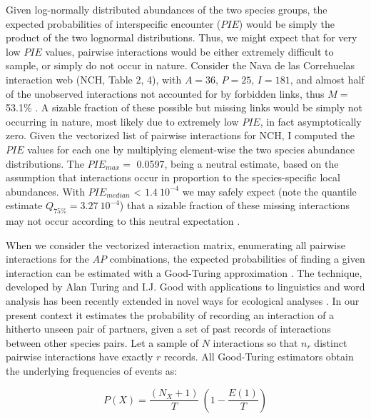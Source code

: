 \documentclass[12pt]{article}
\begin{document}
Given log-normally distributed abundances of the two species groups, the expected probabilities of interspecific encounter ($PIE$) would be simply the product of the two lognormal distributions. Thus, we might expect that for very low $PIE$ values, pairwise interactions would be either extremely difficult to sample, or simply do not occur in nature. Consider the Nava de las Correhuelas interaction web (NCH, Table 2, 4), with $A= 36$, $P= 25$, $I= 181$, and almost half of the unobserved interactions not accounted for by forbidden links, thus $M=$ 53.1\% \citep{Jordano:2009c}. A sizable fraction of these possible but missing links would be simply not occurring in nature, most likely due to extremely low $PIE$, in fact asymptotically zero. Given the vectorized list of pairwise interactions for NCH, I computed the $PIE$ values for each one by multiplying element-wise the two species abundance distributions. The ${PIE}_{max}=$ 0.0597, being a neutral estimate, based on the assumption that interactions occur in proportion to the species-specific local abundances. With $PIE_{median}$ < $1.4\ 10^{-4}$ we may safely expect (note the quantile estimate $Q_{75\%}= $$3.27\ 10^{-4}$) that a sizable fraction of these missing interactions may  not occur according to this neutral expectation \citep{E31/2562,Olesen:2011a} \citep[neutral forbidden links, \emph{sensu}][]{Canard:2012jy}.  

When we consider the vectorized interaction matrix, enumerating all pairwise interactions for the $AP$ combinations, the expected probabilities of finding a given interaction can be estimated with a Good-Turing approximation \citep{Good:1953tn}. The technique, developed by Alan Turing and I.J. Good with applications to linguistics and word analysis \citep{Gale:1995uy} has been recently extended in novel ways for ecological analyses \citep{Chao:2015tc}. In our present context it estimates the probability of recording an interaction of a hitherto unseen pair of partners, given a set of past records of interactions between other species pairs. Let a sample of $N$ interactions so that $n_r$ distinct pairwise interactions have exactly $r$ records. All Good-Turing estimators obtain the underlying frequencies of events as:

\begin{equation}
P(X)= \frac{(N_X + 1)}{T}\ (1-\frac{E(1)}{T})
\end{equation}
\end{document}
